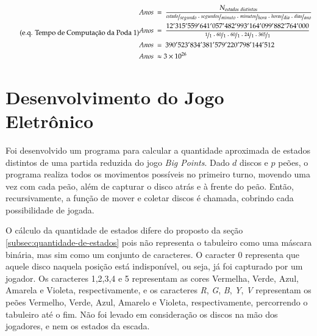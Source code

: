 \begin{equation} \label{eq:anos_poda1} \tag{e.q. Tempo de Computação da Poda 1}
\begin{split}
Anos\ &=\ \dfrac{N_{estados\ distintos}}{\nicefrac{estado}{segundo}\cdot\nicefrac{segundos}{minuto}\cdot\nicefrac{minutos}{hora}\cdot\nicefrac{horas}{dia}\cdot\nicefrac{dias}{ano}}\\
Anos\ &=\ \dfrac{12'315'559'641'057'482'993'164'099'882'764'000}{\nicefrac{1}{1}\cdot\nicefrac{60}{1}\cdot\nicefrac{60}{1}\cdot\nicefrac{24}{1}\cdot\nicefrac{365}{1}}\\
Anos\ &=\ 390'523'834'381'579'220'798'144'512\\
Anos\ &\approx 3\times10^{26}
\end{split}
\end{equation}

\section{Desenvolvimento do Jogo Eletrônico}

Foi desenvolvido um programa para calcular a quantidade aproximada de estados distintos de uma partida reduzida do jogo \emph{Big Points}. Dado $d$ discos e $p$ peões, o programa realiza todos os movimentos possíveis no primeiro turno, movendo uma vez com cada peão, além de capturar o disco atrás e à frente do peão. Então, recursivamente, a função de mover e coletar discos é chamada, cobrindo cada possibilidade de jogada.

O cálculo da quantidade de estados difere do proposto da seção \ref{subsec:quantidade-de-estados} pois não representa o tabuleiro como uma máscara binária, mas sim como um conjunto de caracteres. O caracter 0 representa que aquele disco naquela posição está indisponível, ou seja, já foi capturado por um jogador. Os caracteres 1,2,3,4 e 5 representam as cores Vermelha, Verde, Azul, Amarela e Violeta, respectivamente, e os caracteres \emph{R}, \emph{G}, \emph{B}, \emph{Y}, \emph{V} representam os peões Vermelho, Verde, Azul, Amarelo e Violeta, respectivamente, percorrendo o tabuleiro até o fim. Não foi levado em consideração os discos na mão dos jogadores, e nem os estados da escada.


